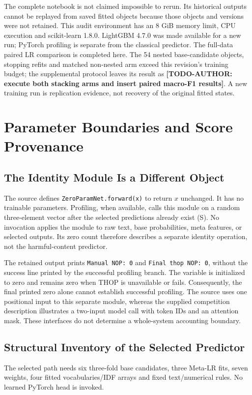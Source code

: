 \documentclass[doublecolumn]{ijcvsplatex}
\newcommand{\AuthorTodo}[1]{\textbf{[TODO-AUTHOR:\allowbreak{} #1]}}
\begin{document}
The complete notebook is not claimed impossible to rerun. Its historical outputs cannot be replayed from saved fitted objects because those objects and versions were not retained. This audit environment has an 8 GiB memory limit, CPU execution and scikit-learn 1.8.0. LightGBM 4.7.0 was made available for a new run; PyTorch profiling is separate from the classical predictor. The full-data paired LR comparison is completed here. The 54 nested base-candidate objects, stopping refits and matched non-nested arm exceed this revision's training budget; the supplemental protocol leaves its result as \AuthorTodo{execute both stacking arms and insert paired macro-F1 results}. A new training run is replication evidence, not recovery of the original fitted states.

\section{Parameter Boundaries and Score Provenance}
\label{sec:accounting}

\subsection{The Identity Module Is a Different Object}
The source defines \texttt{ZeroParamNet.forward(x)} to return $x$ unchanged. It has no trainable parameters. Profiling, when available, calls this module on a random three-element vector after the selected predictions already exist (S). No invocation applies the module to raw text, base probabilities, meta features, or selected outputs. Its zero count therefore describes a separate identity operation, not the harmful-content predictor.

The retained output prints \texttt{Manual NOP: 0} and \texttt{Final thop NOP: 0}, without the success line printed by the successful profiling branch. The variable is initialized to zero and remains zero when THOP is unavailable or fails. Consequently, the final printed zero alone cannot establish successful profiling. The source uses one positional input to this separate module, whereas the supplied competition description illustrates a two-input model call with token IDs and an attention mask. These interfaces do not determine a whole-system accounting boundary.

\subsection{Structural Inventory of the Selected Predictor}
The selected path needs six three-fold base candidates, three Meta-LR fits, seven weights, four fitted vocabularies/IDF arrays and fixed text/numerical rules. No learned PyTorch head is invoked.
\end{document}
